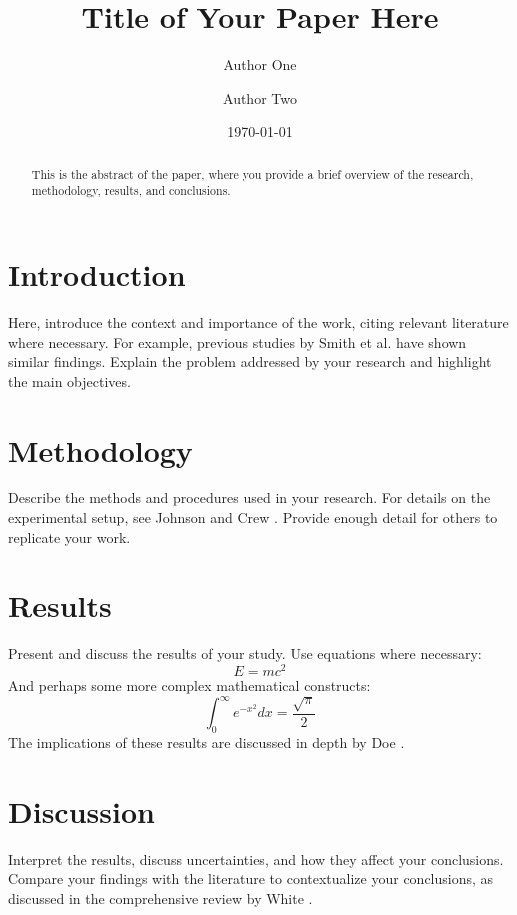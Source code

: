 \documentclass[aps,pre,reprint,groupedaddress]{revtex4-1}
\begin{document}
\title{Title of Your Paper Here}

\author{Author One}

\author{Author Two}

\date{\today}

\begin{abstract}
This is the abstract of the paper, where you provide a brief overview of the research, methodology, results, and conclusions.
\end{abstract}

\maketitle

\section{Introduction}
Here, introduce the context and importance of the work, citing relevant literature where necessary. For example, previous studies by Smith et al. \cite{Smith2020} have shown similar findings. Explain the problem addressed by your research and highlight the main objectives.

\section{Methodology}
Describe the methods and procedures used in your research. For details on the experimental setup, see Johnson and Crew \cite{Johnson2019}. Provide enough detail for others to replicate your work.

\section{Results}
Present and discuss the results of your study. Use equations where necessary:
\begin{equation}
    E = mc^2
\end{equation}
And perhaps some more complex mathematical constructs:
\begin{equation}
    \int_0^\infty e^{-x^2} dx = \frac{\sqrt{\pi}}{2}
\end{equation}
The implications of these results are discussed in depth by Doe \cite{Doe2018}.

\section{Discussion}
Interpret the results, discuss uncertainties, and how they affect your conclusions. Compare your findings with the literature to contextualize your conclusions, as discussed in the comprehensive review by White \cite{White2017}.
\end{document}
